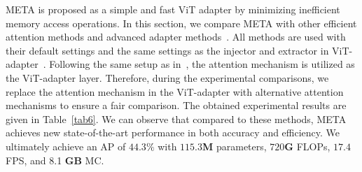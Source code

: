{} META is proposed as a simple and fast ViT adapter by minimizing inefficient memory access operations. In this section, we compare META with other efficient attention methods and advanced adapter methods~\citep{marouf2024mini,xia2022vision,sung2022vl}. All methods are used with their default settings and the same settings as the injector and extractor in ViT-adapter~\citep{chen2022vision}. Following the same setup as in~\citep{chen2022vision}, the attention mechanism is utilized as the ViT-adapter layer. Therefore, during the experimental comparisons, we replace the attention mechanism in the ViT-adapter with alternative attention mechanisms to ensure a fair comparison. 
The obtained experimental results are given in Table~\ref{tab6}. We can observe that compared to these methods, META achieves new state-of-the-art performance in both accuracy and efficiency. We ultimately achieve an AP of $44.3\%$ with $115.3$\textbf{M} parameters, $720$\textbf{G} FLOPs, $17.4$ FPS, and 8.1 \textbf{GB} MC. 
\begin{table}[t]
\centering
\footnotesize
\renewcommand\arraystretch{1.2}
\end{table}

